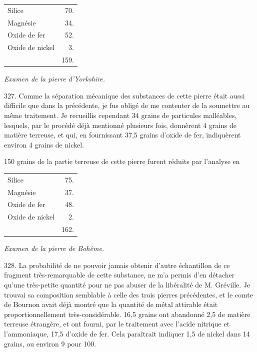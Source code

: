 \documentclass[a4paper, 11pt, oneside, polutonikogreek, french]{article}
\begin{document}
\begin{table}[!ht]
    \centering
    \bfseries
    \Fontauri
    \Large
    \begin{tabular}{l r}
        Silice & 70. \\
        Magnésie & 34. \\
        Oxide de fer & 52. \\
        Oxide de nickel & 3. \\ \hline
        ~ & 159. \\
    \end{tabular}
\end{table}

\begin{center}
\emph{Examen de la pierre d'Yorkshire.}
\end{center}

327. Comme la séparation mécanique des substances de cette pierre était aussi difficile que dans la précédente, je fus obligé de me contenter de la soumettre au même traitement. Je recueillis cependant 34 grains de particules malléables, lesquels, par le procédé déjà mentionné plusieurs fois, donnèrent 4 grains de matière terreuse, et qui, en fournissant 37,5 grains d'oxide de fer, indiquèrent environ 4 grains de nickel.

150 grains de la partie terreuse de cette pierre furent réduits par l'analyse en

\begin{table}[!ht]
    \centering
    \bfseries
    \Fontauri
    \Large
    \begin{tabular}{l r}
        Silice & 75. \\
        Magnésie & 37. \\
        Oxide de fer & 48. \\
        Oxide de nickel & 2. \\ \hline
        ~ & 162. \\
    \end{tabular}
\end{table}

\begin{center}
\emph{Examen de la pierre de Bohême.}
\end{center}

328. La probabilité de ne pouvoir jamais obtenir d'autre échantillon de ce fragment très-remarquable de cette substance, ne m'a permis d'en détacher qu'une très-petite quantité pour ne pas abuser de la libéralité de M. Gréville. Je trouvai sa composition semblable à celle des trois pierres précédentes, et le comte de Bournon avait déjà montré que la quantité de métal attirable était proportionnellement très-considérable. 16,5 grains ont abandonné 2,5 de matière terreuse étrangère, et ont fourni, par le traitement avec l'acide nitrique et l'ammoniaque, 17,5 d'oxide de fer. Cela paraîtrait indiquer 1,5 de nickel dans 14 grains, ou environ 9 pour 100.
\end{document}
